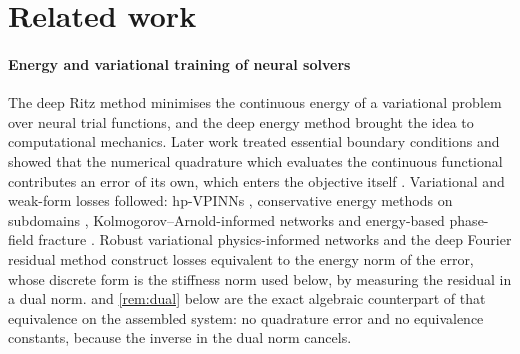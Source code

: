 \section{Related work}\label{sec:related}

\paragraph{Energy and variational training of neural solvers}
The deep Ritz method \cite{EYu2018} minimises the continuous energy of a variational
problem over neural trial functions, and the deep energy method \cite{Samaniego2020}
brought the idea to computational mechanics. Later work treated essential boundary
conditions \cite{LiaoMing2021} and showed that the numerical quadrature which evaluates the
continuous functional contributes an error of its own, which enters the objective itself
\cite{LiuCaiRamani2023}. Variational and weak-form losses followed: hp-VPINNs
\cite{Kharazmi2021}, conservative energy methods on subdomains \cite{Wang2022CENN},
Kolmogorov--Arnold-informed networks \cite{Wang2025KINN} and energy-based phase-field
fracture \cite{Manav2024}. Robust variational physics-informed networks \cite{Rojas2024}
and the deep Fourier residual method \cite{Taylor2023DFR,Taylor2024} construct losses
equivalent to the energy norm of the error, whose discrete form is the stiffness norm used
below, by measuring the residual in a dual norm.  and \cref{rem:dual} below
are the exact algebraic counterpart of that equivalence on the assembled system: no
quadrature error and no equivalence constants, because the inverse in the dual norm cancels.

